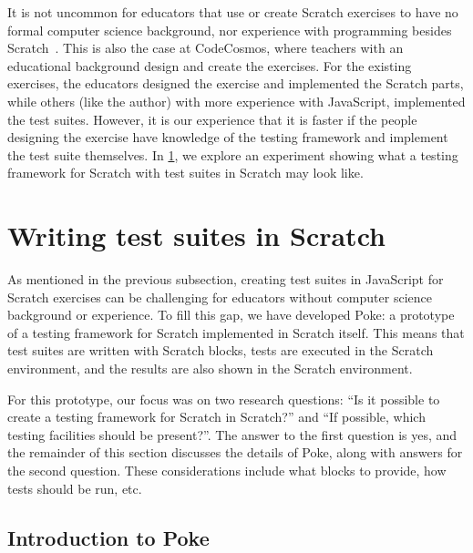 \documentclass[../main]{subfiles}
\begin{document}
It is not uncommon for educators that use or create Scratch exercises to have no formal computer science background, nor experience with programming besides Scratch~\autocite{kimEnhancingTeachersICT2012,oliveiraIntroductionComputationalThinking2019}.
This is also the case at CodeCosmos, where teachers with an educational background design and create the exercises.
For the existing exercises, the educators designed the exercise and implemented the Scratch parts, while others (like the author) with more experience with JavaScript, implemented the test suites.
However, it is our experience that it is faster if the people designing the exercise have knowledge of the testing framework and implement the test suite themselves.
In \cref{sec:poke:-a-testing-framework-written-in-scratch}, we explore an experiment showing what a testing framework for Scratch with test suites in Scratch may look like.

\section{Writing test suites in Scratch}\label{sec:poke:-a-testing-framework-written-in-scratch}

As mentioned in the previous subsection, creating test suites in JavaScript for Scratch exercises can be challenging for educators without computer science background or experience.
To fill this gap, we have developed Poke: a prototype of a testing framework for Scratch implemented in Scratch itself.
This means that test suites are written with Scratch blocks, tests are executed in the Scratch environment, and the results are also shown in the Scratch environment.

For this prototype, our focus was on two research questions: ``Is it possible to create a testing framework for Scratch in Scratch?'' and ``If possible, which testing facilities should be present?''.
The answer to the first question is yes, and the remainder of this section discusses the details of Poke, along with answers for the second question.
These considerations include what blocks to provide, how tests should be run, etc.

\subsection{Introduction to Poke}\label{subsec:introduction-to-poke}
\end{document}

